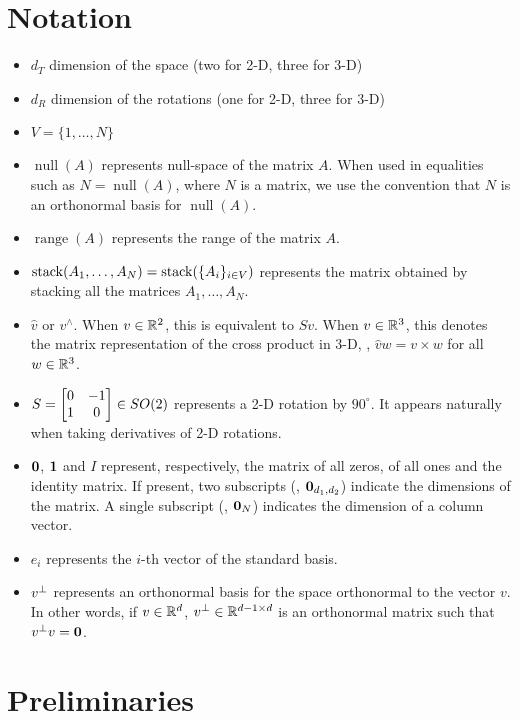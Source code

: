 \documentclass[12pt]{article}
\DeclareMathOperator{\nullspace}{null}
\DeclareMathOperator{\rangespace}{range}
\begin{document}
\section{Notation}
\begin{itemize}
\item $d_T$ dimension of the space (two for 2-D, three for 3-D)
\item $d_R$ dimension of the rotations (one for 2-D, three for 3-D)
\item $V=\{1,\ldots,N\}$
\item $\nullspace(A)$ represents null-space of the matrix $A$. When used in equalities such as $N=\nullspace(A)$, where $N$ is a matrix, we use the convention that $N$ is an orthonormal basis for $\nullspace(A)$. 
\item $\rangespace(A)$ represents the range of the matrix $A$.
\item $\operatorname{stack}(A_1,\ldots,A_N)=\operatorname{stack}(\{A_i\}_{i \in V})$ represents the matrix obtained by stacking all the matrices $A_1,\ldots,A_N$.
\item $\hat{v}$ or $v^\wedge$. When $v\in\mathbb{R}^{2}{}$, this is equivalent to $Sv$. When $v\in\mathbb{R}^{3}{}$, this denotes the matrix representation of the cross product in 3-D, \ie, $\hat{v}w=v\times w$ for all $w\in\mathbb{R}^{3}{}$.
\item $S=\begin{bmatrix}0 & -1\\ 1 & 0\end{bmatrix}\in SO(2)$ represents a 2-D rotation by $90^\circ$. It appears naturally when taking derivatives of 2-D rotations.
\item $\boldsymbol{0}$, $\boldsymbol{1}$ and $I$ represent, respectively, the matrix of all zeros, of all ones and the identity matrix. If present, two subscripts (\eg, $\boldsymbol{0}_{d_1,d_2}$) indicate the dimensions of the matrix. A single subscript (\eg, $\boldsymbol{0}_N$) indicates the dimension of a column vector.
\item $e_i$ represents the $i$-th vector of the standard basis.
\item $v^{\bot}$ represents an orthonormal basis for the space orthonormal to the vector $v$. In other words, if $v\in\mathbb{R}^{d}{}$, $v^{\bot}\in\mathbb{R}^{d-1\times d}{}$ is an orthonormal matrix such that $v^{\bot} v=\boldsymbol{0}$. 
\end{itemize}
\section{Preliminaries}
\end{document}
